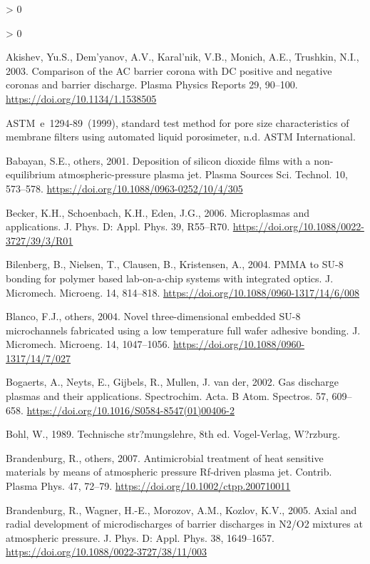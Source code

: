 \documentclass[
  11pt,
  twoside]{article}
\newlength{\cslhangindent}
\newenvironment{CSLReferences}[2] %
 {%
  \setlength{\parindent}{0pt}
  \ifodd #1 \everypar{\setlength{\hangindent}{\cslhangindent}}\ignorespaces\fi
  \ifnum #2 > 0
  \setlength{\parskip}{#2\baselineskip}
  \fi
 }%
 {}
\begin{document}
\begin{CSLReferences}{1}{0}
\begin{CSLReferences}{1}{0}
\leavevmode\hypertarget{ref-Akis03}{}%
Akishev, Yu.S., Dem'yanov, A.V., Karal'nik, V.B., Monich, A.E., Trushkin, N.I., 2003. Comparison of the AC barrier corona with DC positive and negative coronas and barrier discharge. Plasma Physics Reports 29, 90--100. \url{https://doi.org/10.1134/1.1538505}

\leavevmode\hypertarget{ref-ASTME1294}{}%
{ASTM}~e~1294-89~(1999), standard test method for pore size characteristics of membrane filters using automated liquid porosimeter, n.d. ASTM International.

\leavevmode\hypertarget{ref-Baba01}{}%
Babayan, S.E., others, 2001. Deposition of silicon dioxide films with a non-equilibrium atmospheric-pressure plasma jet. Plasma Sources Sci. Technol. 10, 573--578. \url{https://doi.org/10.1088/0963-0252/10/4/305}

\leavevmode\hypertarget{ref-Beck06}{}%
Becker, K.H., Schoenbach, K.H., Eden, J.G., 2006. Microplasmas and applications. J. Phys. D: Appl. Phys. 39, R55--R70. \url{https://doi.org/10.1088/0022-3727/39/3/R01}

\leavevmode\hypertarget{ref-Bile04}{}%
Bilenberg, B., Nielsen, T., Clausen, B., Kristensen, A., 2004. PMMA to SU-8 bonding for polymer based lab-on-a-chip systems with integrated optics. J. Micromech. Microeng. 14, 814--818. \url{https://doi.org/10.1088/0960-1317/14/6/008}

\leavevmode\hypertarget{ref-Blan04}{}%
Blanco, F.J., others, 2004. Novel three-dimensional embedded {SU-8} microchannels fabricated using a low temperature full wafer adhesive bonding. J. Micromech. Microeng. 14, 1047--1056. \url{https://doi.org/10.1088/0960-1317/14/7/027}

\leavevmode\hypertarget{ref-Boga02}{}%
Bogaerts, A., Neyts, E., Gijbels, R., Mullen, J. van der, 2002. Gas discharge plasmas and their applications. Spectrochim. Acta. B Atom. Spectros. 57, 609--658. \url{https://doi.org/10.1016/S0584-8547(01)00406-2}

\leavevmode\hypertarget{ref-Bohl1989}{}%
Bohl, W., 1989. Technische str?mungslehre, 8th ed. Vogel-Verlag, W?rzburg.

\leavevmode\hypertarget{ref-Bran07}{}%
Brandenburg, R., others, 2007. Antimicrobial treatment of heat sensitive materials by means of atmospheric pressure {Rf}-driven plasma jet. Contrib. Plasma Phys. 47, 72--79. \url{https://doi.org/10.1002/ctpp.200710011}

\leavevmode\hypertarget{ref-Bran05}{}%
Brandenburg, R., Wagner, H.-E., Morozov, A.M., Kozlov, K.V., 2005. Axial and radial development of microdischarges of barrier discharges in {N2/O2} mixtures at atmospheric pressure. J. Phys. D: Appl. Phys. 38, 1649--1657. \url{https://doi.org/10.1088/0022-3727/38/11/003}


\end{CSLReferences}
\end{CSLReferences}
\end{document}
